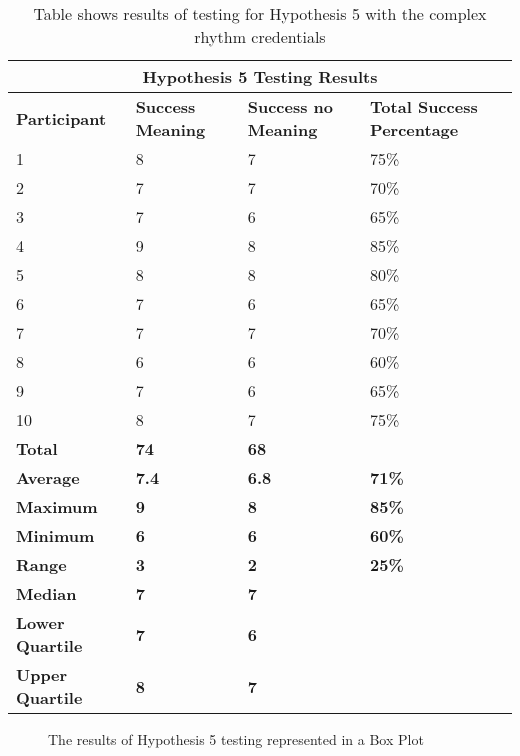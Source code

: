 \documentclass{article}
\begin{document}
{
\begin{table} [H]
\centering
\begin{tabular}{ |p{2cm}|p{4cm}|p{4cm}| p{4cm} | }
\hline
\multicolumn{4}{|c|}{\textbf{Hypothesis 5 Testing Results}} \\
\hline
\textbf{Participant} & \textbf{Success Meaning} & \textbf{Success no Meaning} & \textbf{Total Success Percentage} \\
\hline
1 & 8 & 7 & 75\% \\
\hline
2 & 7 & 7 & 70\% \\
\hline
3 & 7 & 6 & 65\% \\
\hline
4 & 9 & 8 & 85\%  \\
\hline
5 & 8 & 8 & 80\% \\
\hline
6 & 7 & 6 & 65\% \\
\hline
7 & 7 & 7 & 70\% \\
\hline
8 & 6 & 6 & 60\% \\
\hline
9 & 7 & 6 & 65\% \\
\hline
10 & 8 & 7 & 75\% \\
\hline
\textbf{Total} & \textbf{74} & \textbf{68} & \\
\hline
\textbf{Average} & \textbf{7.4} & \textbf{6.8} & \textbf{71\%} \\
\hline
\textbf{Maximum} & \textbf{9} & \textbf{8} & \textbf{85\%} \\
\hline
\textbf{Minimum} & \textbf{6} & \textbf{6} & \textbf{60\%} \\
\hline
\textbf{Range} & \textbf{3} & \textbf{2} & \textbf{25\%} \\
\hline
\textbf{Median} & \textbf{7} & \textbf{7} & \\
\hline
\textbf{Lower Quartile} & \textbf{7} & \textbf{6} & \\
\hline
\textbf{Upper Quartile} & \textbf{8} & \textbf{7} & \\
\hline
\end{tabular}
\caption{Table shows results of testing for Hypothesis 5 with the complex rhythm credentials}
\label{table:6}
\end{table}
}

\begin{figure} [H]
    \centering
    \caption{The results of Hypothesis 5 testing represented in a Box Plot}
    \label{fig:boxPlotHyp5}
\end{figure}
\end{document}
